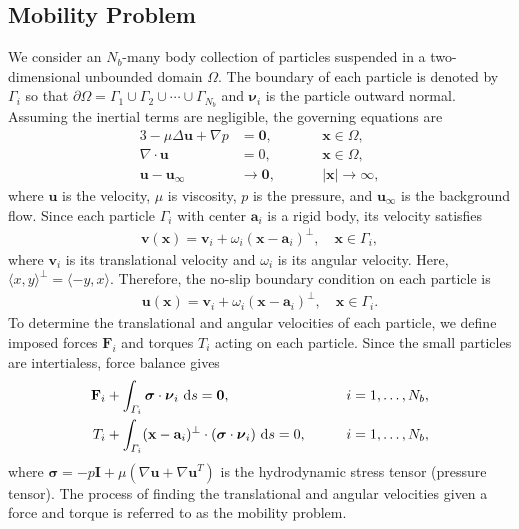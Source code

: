 \documentclass[lineno]{jfm}
\renewcommand{\aa}{\mathbf{a}}
\newcommand{\bd}{\partial}
\newcommand{\FF}{\mathbf{F}}
\newcommand{\nnu}{\boldsymbol{\nu}}
\newcommand{\ssigma}{\boldsymbol{\sigma}}
\newcommand{\xx}{\mathbf{x}}
\newcommand{\uu}{\mathbf{u}}
\renewcommand{\vv}{\mathbf{v}}
\begin{document}
\subsection{\label{mobility}Mobility Problem}
We consider an $N_b$-many body collection of particles suspended in a
two-dimensional unbounded domain $\Omega$. The boundary of each particle
is denoted by $\Gamma_i$ so that $\bd \Omega = \Gamma_1 \cup \Gamma_2
\cup \cdots \cup \Gamma_{N_b}$ and $\nnu_i$ is the particle outward
normal. Assuming the inertial terms are negligible, the governing
equations are
\begin{alignat}{3}
  -\mu \Delta \uu + \nabla p &= \mathbf{0}, 
    && \xx \in \Omega, \\
  \nabla\cdot \uu &= 0, \qquad && \xx \in \Omega, \\
  \uu - \uu_\infty &\to \mathbf{0}, && |\xx| \to \infty,
\end{alignat}
%
where $\uu$ is the velocity, $\mu$ is viscosity, $p$ is the pressure,
and $\uu_\infty$ is the background flow. Since each particle $\Gamma_i$
with center $\aa_i$ is a rigid body, its velocity satisfies 
\begin{align}
  \vv(\xx) = \vv_i + \omega_i (\xx - \aa_i)^\perp, \quad 
    \xx \in \Gamma_i,
\end{align}
where $\vv_i$ is its translational velocity and $\omega_i$ is its
angular velocity. Here, $\langle x, y \rangle^{\perp} = \langle -y, x
\rangle$. Therefore, the no-slip boundary condition on each particle is
\begin{align}
  \uu(\xx) = \vv_i + \omega_i (\xx - \aa_i)^\perp, \quad
    \xx \in \Gamma_i.
\end{align}
To determine the translational and angular velocities of each particle,
we define imposed forces $\FF_i$ and torques $T_i$ acting on each
particle. Since the small particles are intertialess, force balance
gives 
\begin{alignat}{2}
  \label{eq:force}
  \FF_i &+ \int_{\Gamma_i} \ssigma \cdot \nnu_i \, \dif s = \mathbf{0},
  && i=1,\ldots,N_b,\\
  \label{eq:torque}
  T_i &+ \int_{\Gamma_i} (\xx - \aa_i)^\perp \cdot 
    (\ssigma \cdot \nnu_i) \, \dif s = 0, \qquad && i=1,\ldots,N_b,
\end{alignat}
where $\ssigma = -p \mathbf{I} + \mu \left(\nabla \uu + \nabla \uu^T
\right)$ is the hydrodynamic stress tensor (pressure tensor).
The process of finding the translational and angular velocities given a
force and torque is referred to as the mobility problem.
\end{document}
